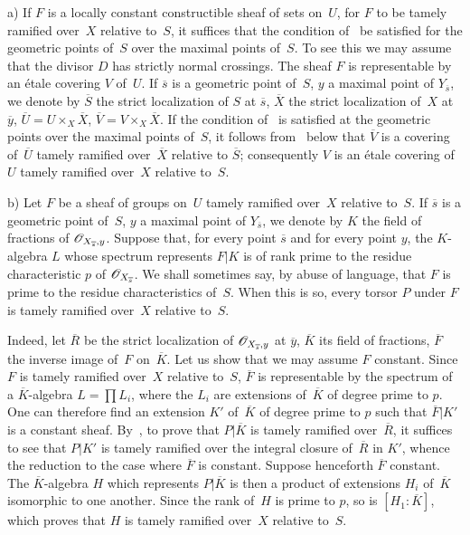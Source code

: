 \begin{remarks}
\label{XIII.2.3}

a) If $F$ is a locally constant constructible sheaf of sets
on~$U$, for $F$ to be tamely
ramified over~$X$ relative to~$S$, it suffices that the condition
of~ be satisfied for the geometric
points of~$S$ over the maximal points of~$S$. To
see this we may assume that the divisor $D$ has strictly normal
crossings. The sheaf $F$ is representable by an étale
covering $V$ of~$U$. If $\overline{s}$ is a geometric
point of~$S$, $y$ a maximal point of
$Y_{\overline{s}}$, we denote by $\overline{S}$ the strict localization of
$S$ at $\overline{s}$, $\overline{X}$ the strict localization of~$X$ at
$\overline{y}$, $\overline{U}=U\times_X \overline{X}$,
$\overline{V}=V\times_X\overline{X}$. If the condition
of~ is satisfied at the geometric points
over the maximal points of~$S$, it follows from~
below that $\overline{V}$ is a covering of~$\overline{U}$
tamely ramified over~$\overline{X}$ relative to
$\overline{S}$; consequently $V$ is an étale covering of~$U$
tamely ramified over~$X$ relative to~$S$.

b)
Let $F$ be a sheaf of groups on~$U$ tamely
ramified over~$X$ relative to~$S$. If $\overline{s}$ is a
geometric point of~$S$, $y$ a maximal point of
$Y_{\overline{s}}$, we denote by $K$ the field of fractions of
$\cal{O}_{X_{\overline{s}},y}$. Suppose that, for every point
$\overline{s}$ and for every point $y$, the $K$-algebra $L$ whose
spectrum represents $F|K$ is of rank prime to the
residue characteristic $p$ of
$\cal{O}_{X_{\overline{s}}}$. We shall sometimes say, by abuse of language,
that $F$ is prime to the residue characteristics of~$S$.
When this is so, every torsor $P$ under $F$ is
tamely ramified over~$X$ relative to~$S$.

Indeed, let $\overline{R}$ be the strict localization of
$\cal{O}_{X_{\overline{s}},y}$ at $\overline{y}$, $\overline{K}$ its
field of fractions, $\overline{F}$ the inverse image of~$F$ on~$\overline{K}$. Let us show that we may assume $F$ constant. Since
$F$ is tamely ramified over~$X$ relative to~$S$,
$\overline{F}$ is representable by the spectrum of a
$\overline{K}$-algebra $L=\prod L_i$, where the $L_i$ are
extensions of~$\overline{K}$ of degree prime to $p$. One can
therefore find an extension $K'$ of~$\overline{K}$ of degree prime
to $p$ such that $\overline{F}|K'$ is a constant
sheaf. By~, to prove that
$P|\overline{K}$ is tamely ramified over~$\overline{R}$, it suffices to see that $P|K'$ is tamely
ramified over the integral closure of~$\overline{R}$ in
$K'$, whence the reduction to the case where $\overline{F}$ is
constant. Suppose henceforth $\overline{F}$ constant. The
$\overline{K}$-algebra $H$ which represents $P|\overline{K}$ is
then a product of extensions $H_i$ of~$\overline{K}$ isomorphic to
one another. Since the rank of~$H$ is prime to $p$, so is
$[H_1:\overline{K}]$, which proves that $H$ is
tamely ramified over~$X$ relative to~$S$.


\end{remarks}
